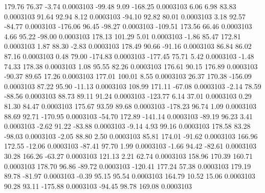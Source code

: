       179.76       76.37       -3.74     0.0003103
      -99.48        9.09     -168.25     0.0003103
        6.06        6.98       83.83     0.0003103
       91.64       92.94        8.12     0.0003103
      -94.10       92.82       80.01     0.0003103
        3.18       92.57      -84.77     0.0003103
     -176.06       96.45      -98.27     0.0003103
     -109.51      173.56       66.46     0.0003103
        4.66       95.22      -98.00     0.0003103
      178.13      101.29        5.01     0.0003103
       -1.86       85.47      172.81     0.0003103
        1.87       88.30       -2.83     0.0003103
      178.49       90.66      -91.16     0.0003103
       86.84       86.02       87.16     0.0003103
        0.48       79.00     -174.83     0.0003103
     -177.45       75.71        5.42     0.0003103
       -1.48       74.33      178.38     0.0003103
        1.08       95.55       82.26     0.0003103
      176.61       90.15      176.89     0.0003103
      -90.37       89.65       17.26     0.0003103
      177.01      100.01        8.55     0.0003103
       26.37      170.38     -156.09     0.0003103
       87.22       95.90      -11.13     0.0003103
      108.99      171.11      -67.08     0.0003103
       -2.14       78.59      -88.56     0.0003103
       88.73       89.11       91.24     0.0003103
     -123.77        6.14       37.01     0.0003103
        0.29       81.30       84.47     0.0003103
      175.67       93.59       89.68     0.0003103
     -178.23       96.74        1.09     0.0003103
       88.69       92.71     -170.95     0.0003103
      -54.70      172.89     -141.14     0.0003103
      -89.19       96.23        3.41     0.0003103
       -2.62       91.22      -83.88     0.0003103
       -9.14        4.93       99.16     0.0003103
      178.58       83.28      -98.03     0.0003103
       -2.05       88.80        2.50     0.0003103
       85.81      174.01      -91.62     0.0003103
      166.96      172.55      -12.06     0.0003103
      -87.41       97.70        1.99     0.0003103
       -1.66       94.42      -82.61     0.0003103
       30.28      166.26      -63.27     0.0003103
      121.13        2.21       62.74     0.0003103
      158.96      170.39      160.71     0.0003103
      178.70       96.86      -89.72     0.0003103
     -120.41      177.24       57.38     0.0003103
      179.19       89.78      -81.97     0.0003103
       -0.39       95.15       95.54     0.0003103
      164.79       10.52       15.06     0.0003103
       90.28       93.11     -175.88     0.0003103
      -94.45       98.78      169.08     0.0003103

